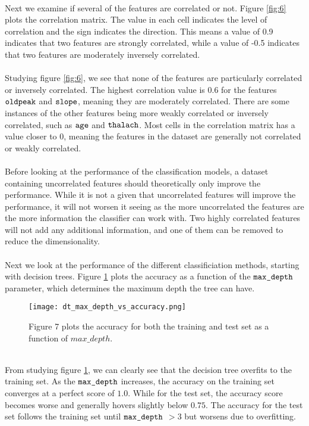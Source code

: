 \documentclass[a4paper,twocolumn]{article}
\begin{document}
\\
Next we examine if several of the features are correlated or not. Figure \ref{fig:6} plots the correlation matrix. The value in each cell indicates the level of correlation and the sign indicates the direction. This means a value of 0.9 indicates that two features are strongly correlated, while a value of -0.5 indicates that two features are moderately inversely correlated. \\
\\
Studying figure \ref{fig:6}, we see that none of the features are particularly correlated or inversely correlated. The highest correlation value is 0.6 for the features $\verb"oldpeak"$ and $\verb"slope"$, meaning they are moderately correlated. There are some instances of the other features being more weakly correlated or inversely correlated, such as $\verb"age"$ and $\verb"thalach"$. Most cells in the correlation matrix has a value closer to 0, meaning the features in the dataset are generally not correlated or weakly correlated.
\\
\\
Before looking at the performance of the classification models, a dataset containing uncorrelated features should theoretically only improve the performance. While it is not a given that uncorrelated features will improve the performance, it will not worsen it seeing as the more uncorrelated the features are the more information the classifier can work with. Two highly correlated features will not add any additional information, and one of them can be removed to reduce the dimensionality. \\
\\
Next we look at the performance of the different classificiation methods, starting with decision trees. Figure \ref{fig:7} plots the accuracy as a function of the $\verb"max_depth"$ parameter, which determines the maximum depth the tree can have.
\begin{figure}[ht]
    \centering
    \texttt{[image: dt\_max\_depth\_vs\_accuracy.png]}
    \caption{Figure 7 plots the accuracy for both the training and test set as a function of $max\_depth$.}
    \label{fig:7}
\end{figure}\\
From studying figure \ref{fig:7}, we can clearly see that the decision tree overfits to the training set. As the $\verb"max_depth"$ increases, the accuracy on the training set converges at a perfect score of $1.0$. While for the test set, the accuracy score becomes worse and generally hovers slightly below $0.75$. The accuracy for the test set follows the training set until $\verb"max_depth"$ $> 3$ but worsens due to overfitting. \\
\end{document}
